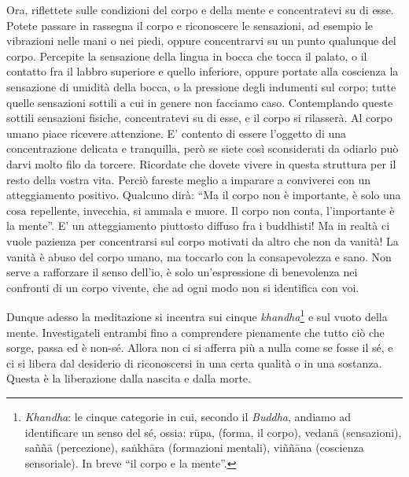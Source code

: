 Ora, riflettete sulle condizioni del corpo e della mente e concentratevi
su di esse. Potete passare in rassegna il corpo e riconoscere le
sensazioni, ad esempio le vibrazioni nelle mani o nei piedi, oppure
concentrarvi su un punto qualunque del corpo. Percepite la sensazione
della lingua in bocca che tocca il palato, o il contatto fra il labbro
superiore e quello inferiore, oppure portate alla coscienza la
sensazione di umidità della bocca, o la pressione degli indumenti sul
corpo; tutte quelle sensazioni sottili a cui in genere non facciamo
caso. Contemplando queste sottili sensazioni fisiche, concentratevi su
di esse, e il corpo si rilasserà. Al corpo umano piace ricevere
attenzione. E' contento di essere l'oggetto di una concentrazione
delicata e tranquilla, però se siete così sconsiderati da odiarlo può
darvi molto filo da torcere. Ricordate che dovete vivere in questa
struttura per il resto della vostra vita. Perciò fareste meglio a
imparare a conviverci con un atteggiamento positivo. Qualcuno dirà: ``Ma
il corpo non è importante, è solo una cosa repellente, invecchia, si
ammala e muore. Il corpo non conta, l'importante è la mente''. E' un
atteggiamento piuttosto diffuso fra i buddhisti! Ma in realtà ci vuole
pazienza per concentrarsi sul corpo motivati da altro che non da vanità!
La vanità è abuso del corpo umano, ma toccarlo con la consapevolezza e
sano. Non serve a rafforzare il senso dell'io, è solo un'espressione di
benevolenza nei confronti di un corpo vivente, che ad ogni modo non si
identifica con voi.

Dunque adesso la meditazione si incentra sui cinque \textit{khandha}\footnote{\textit{Khandha}: le cinque categorie in cui, secondo il \textit{Buddha},
andiamo ad identificare un senso del sé, ossia: rūpa, (forma, il corpo),
vedanā (sensazioni), saññā (percezione), saṅkhāra (formazioni mentali),
viññāna (coscienza sensoriale). In breve ``il corpo e la mente''.} e
sul vuoto della mente. Investigateli entrambi fino a comprendere
pienamente che tutto ciò che sorge, passa ed è non-sé. Allora non ci si
afferra più a nulla come se fosse il sé, e ci si libera dal desiderio di
riconoscersi in una certa qualità o in una sostanza. Questa è la
liberazione dalla nascita e dalla morte.

